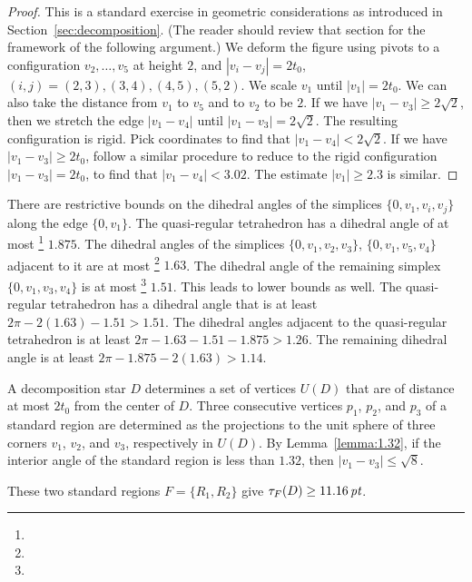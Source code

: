 \begin{proof}
This is a standard exercise in geometric considerations as
introduced in Section~\ref{sec:decomposition}.  (The reader should
review that section for the framework of the following argument.)
We deform the figure using pivots to a configuration
$v_2,\ldots,v_5$ at height $2$, and $|v_i-v_j|=2t_0 $,
$(i,j)=(2,3),(3,4),(4,5),(5,2)$. We scale $v_1$ until $|v_1|=2t_0
$. We can also take the distance from $v_1$ to $v_5$ and to $v_2$
to be $2$. If we have $|v_1-v_3|\ge 2\sqrt{2}$, then we stretch
the edge $|v_1-v_4|$ until $|v_1-v_3|=2\sqrt{2}$. The resulting
configuration is rigid.  Pick coordinates to find that
$|v_1-v_4|<2\sqrt{2}$. If we have $|v_1-v_3|\ge 2t_0 $, follow a
similar procedure to reduce to the rigid configuration
$|v_1-v_3|=2t_0$, to find that $|v_1-v_4|<3.02$. The estimate
$|v_1|\ge2.3$ is similar.
\end{proof}

There are restrictive bounds on the dihedral angles of the
simplices $\{0,v_1,v_i,v_j\}$ along the edge $\{0,v_1\}$. The
quasi-regular tetrahedron has a dihedral angle of at most%
\footnote{} $1.875$.  The dihedral angles of the
simplices $\{0,v_1,v_2,v_3\}$, $\{0,v_1,v_5,v_4\}$
adjacent to it are at most%
\footnote{}  $1.63$. The dihedral angle of the
remaining simplex $\{0,v_1,v_3,v_4\}$ is at most%
\footnote{} $1.51$.   This leads to lower bounds
as well. The quasi-regular tetrahedron has a dihedral angle that
is at least $2\pi - 2(1.63)-1.51 > 1.51$.  The dihedral angles
adjacent to the quasi-regular tetrahedron is at least $2\pi-
1.63-1.51-1.875> 1.26$. The remaining dihedral angle is at least
$2\pi-1.875-2(1.63) > 1.14$.

A decomposition star $D$ determines a set of vertices $U(D)$ that
are of distance at most $2t_0$ from the center of $D$.  Three
consecutive vertices $p_1$, $p_2$, and $p_3$ of a standard region
are determined as the projections to the unit sphere of three
corners $v_1$, $v_2$, and $v_3$, respectively in $U(D)$. By
Lemma~\ref{lemma:1.32}, if the interior angle of the standard
region is less than $1.32$, then $|v_1-v_3|\le\sqrt{8}$.

\begin{lemma} \label{lemma:11.16}
These two standard regions $F=\{R_1,R_2\}$ give
    $\tau_F(D) \ge 11.16\,\hbox{\it pt}$.
\end{lemma}

